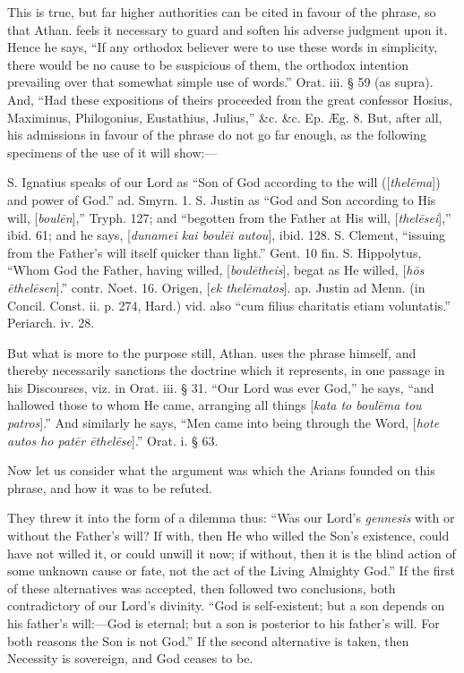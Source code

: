 This is true, but far higher authorities can be
cited in favour of the phrase, so that Athan. feels it necessary to
guard and soften his adverse judgment upon it. Hence he says, “If
any orthodox believer were to use these words in simplicity,
there would be no cause to be suspicious of them, the orthodox
intention prevailing over that somewhat simple use of words.” Orat.
iii. § 59 (as supra). And, “Had these expositions of theirs
proceeded from the great confessor Hosius, Maximinus, Philogonius,
Eustathius, Julius,” \&c. \&c. Ep. Æg. 8. But, after all, his
admissions in favour of the phrase do not go far enough, as the
following specimens of the use of it will show:—

S. Ignatius speaks of our Lord as “Son of God
according to the will ([\emph{thel\={e}ma}]) and power of God.”
ad. Smyrn. 1. S. Justin as “God and Son according to His will, [\emph{boul\={e}n}],”
Tryph. 127; and “begotten from the Father at His will, [\emph{thel\={e}sei}],”
ibid. 61; and he says, [\emph{dunamei kai boul\={e}i autou}], ibid.
128. S. Clement, “issuing from the Father’s will itself quicker
than light.” Gent. 10 fin. S. Hippolytus, “Whom God the Father,
having willed, [\emph{boul\={e}theis}], begat as He willed, [\emph{h\={o}s
\={e}thel\={e}sen}].” contr. Noet. 16. Origen, [\emph{ek thel\={e}matos}].
ap. Justin ad Menn. (in Concil. Const. ii. p. 274, Hard.) vid. also
“cum filius charitatis etiam voluntatis.” Periarch. iv. 28.

But what is more to the purpose still, Athan.
uses the phrase himself, and thereby necessarily sanctions the
doctrine which it represents, in one passage in his Discourses, viz.
in Orat. iii. § 31. “Our Lord was ever God,” he says, “and
hallowed those to whom He came, arranging all things [\emph{kata to boul\={e}ma
tou patros}].” And similarly he says, “Men came into being
through the Word, [\emph{hote autos ho pat\={e}r \={e}thel\={e}se}].”
Orat. i. § 63.

Now let us consider what the argument was which
the Arians founded on this phrase, and how it was to be refuted.

They threw it into the form of a dilemma thus:
“Was our Lord’s \emph{gennesis} with or without the Father’s
will? If with, then He who willed the Son’s existence, could have
not willed it, or could unwill it now; if without, then it is the
blind action of some unknown cause or fate, not the act of the Living
Almighty God.” If the first of these alternatives was accepted, then
followed two conclusions, both contradictory of our Lord’s divinity.
“God is self-existent; but a son depends on his father’s
will:—God is eternal; but a son is posterior to his father’s will.
For both reasons the Son is not God.” If the second alternative is
taken, then Necessity is sovereign, and God ceases to be.


